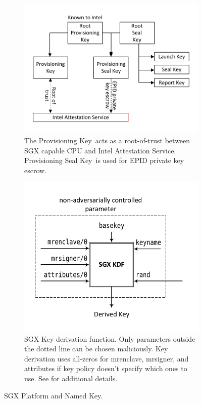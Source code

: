 \documentclass[letterpaper]{article}
\newcommand{\mrenclave}{\textsf{mrenclave}}
\newcommand{\mrsigner}{\textsf{mrsigner}}
\newcommand{\pk}{\textsf{Provisioning Key}}
\newcommand{\psk}{\textsf{Provisioning Seal Key}}
\begin{document}
  \begin{figure}
  \centering
  \begin{subfigure}[t]{.45\textwidth}
    \centering
    \includegraphics[width=\linewidth]{Diagrams/KeyHierarchy}
    \caption{The \pk\ acts as a root-of-trust between SGX capable CPU
      and Intel Attestation Service. \psk\ is used for EPID private
      key escrow.}
    \label{fig:keyhierarchy}
  \end{subfigure}
  \hspace{.05\textwidth}
  \begin{subfigure}[t]{.45\textwidth}
    \centering \includegraphics[width=\linewidth]{Diagrams/SGXKDF}
    \caption{SGX Key derivation function. Only parameters outside the
      dotted line can be chosen maliciously. Key derivation uses
      all-zeros for \mrenclave, \mrsigner, and attributes if key
      policy doesn't specify which ones to use. See
      \cite[\S38.17]{intelsdm} for additional details.}
    \label{fig:sgxkdf}
  \end{subfigure}
  \caption{SGX Platform and Named Key.}
  \label{fig:keys}
  \end{figure}
\end{document}

